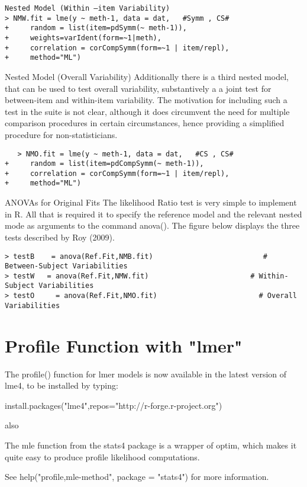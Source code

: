 \documentclass[]{article}
\begin{document}
\begin{verbatim}
Nested Model (Within –item Variability)
> NMW.fit = lme(y ~ meth-1, data = dat,   #Symm , CS# 
+     random = list(item=pdSymm(~ meth-1)),
+     weights=varIdent(form=~1|meth), 
+     correlation = corCompSymm(form=~1 | item/repl), 
+     method="ML")
\end{verbatim}


Nested Model (Overall Variability)
Additionally there is a third nested model, that can be used to test overall variability, substantively a a joint test for between-item and within-item variability. The motivation for including such a test in the suite is not clear, although it does circumvent the need for multiple comparison procedures in certain circumstances, hence providing a simplified procedure for non-statisticians.
\begin{verbatim}
   > NMO.fit = lme(y ~ meth-1, data = dat,   #CS , CS# 
+     random = list(item=pdCompSymm(~ meth-1)), 
+     correlation = corCompSymm(form=~1 | item/repl), 
+     method="ML")
\end{verbatim}

ANOVAs  for  Original Fits
The likelihood Ratio test is very simple to implement in R. All that is required it to specify the reference model and the relevant nested mode as arguments to the command anova().
The figure below displays the three tests described by Roy (2009).
\begin{verbatim}
> testB    = anova(Ref.Fit,NMB.fit)                          # Between-Subject Variabilities
> testW   = anova(Ref.Fit,NMW.fit)                        # Within-Subject Variabilities
> testO     = anova(Ref.Fit,NMO.fit)                        # Overall Variabilities
\end{verbatim}
\newpage
\section{Profile Function with "lmer"}

The profile() function for lmer models is now available in the latest version of lme4, to be installed by typing:

install.packages("lme4",repos="http://r-forge.r-project.org")

also

The mle function from the stats4 package is a wrapper of optim, which makes it quite easy to produce 
profile likelihood computations. 

See help("profile,mle-method", package = "stats4") for more information.
\end{document}
